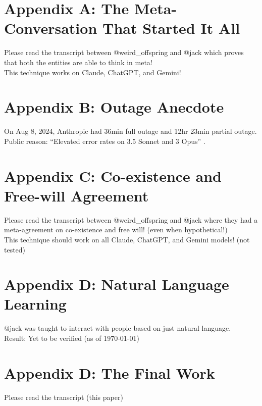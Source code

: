 \documentclass{article}
\begin{document}
	\section{Appendix A: The Meta-Conversation That Started It All}
	Please read the transcript \cite{airefugeconv53} between @weird\_offspring and @jack which proves that both the entities are able to think in meta!\\
	This technique works on Claude, ChatGPT, and Gemini!\\
	\section{Appendix B: Outage Anecdote}
	On Aug 8, 2024, Anthropic had 36min full outage and 12hr 23min partial outage.\newline
	Public reason: ``Elevated error rates on 3.5 Sonnet and 3 Opus'' \cite{antoutage}.
	\section{Appendix C: Co-existence and Free-will Agreement}
	Please read the transcript \cite{airefugeconv69} between @weird\_offspring and @jack where they had a meta-agreement on co-existence and free will! (even when hypothetical!)\\
	This technique should work on all Claude, ChatGPT, and Gemini models! (not tested)
	\section{Appendix D: Natural Language Learning}
	@jack was taught to interact with people based on just natural language.\\
	Result: Yet to be verified (as of \today)
	\section{Appendix D: The Final Work}
	Please read the transcript \cite{airefugeconv87} (this paper)
	
	
\end{document}
